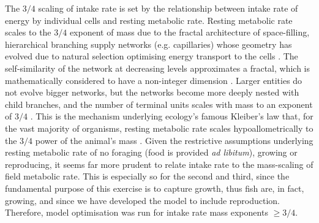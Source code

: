 \documentclass[a4paper]{article} %
\begin{document}
The $3/4$ scaling of intake rate is set by the relationship between intake rate of energy by individual cells and resting metabolic rate. Resting metabolic rate scales to the $3/4$ exponent of mass due to the fractal architecture of space-filling, hierarchical branching supply networks (e.g. capillaries) whose geometry has evolved due to natural selection optimising energy transport to the cells \autocite{West1997, West2005}. The self-similarity of the network at decreasing levels approximates a fractal, which is mathematically considered to have a non-integer dimension \autocite{Hausdorff1918, Mandelbrot1982}. Larger entities do not evolve bigger networks, but the networks become more deeply nested with child branches, and the number of terminal units scales with mass to an exponent of $3/4$  \autocite{West1997}. This is the mechanism underlying ecology's famous Kleiber's law that, for the vast majority of organisms, resting metabolic rate scales hypoallometrically to the $3/4$ power of the animal's mass \autocite{Kleiber1947, peters1983, niklas1994plant}. Given the restrictive assumptions underlying resting metabolic rate of no foraging (food is provided \textit{ad libitum}), growing or reproducing, it seems far more prudent to relate intake rate to the mass-scaling of field metabolic rate. This is especially so for the second and third, since the fundamental purpose of this exercise is to capture growth, thus fish are, in fact, growing, and since we have developed the model to include reproduction. Therefore, model optimisation was run for intake rate mass exponents $\geq 3/4$.
\end{document}
